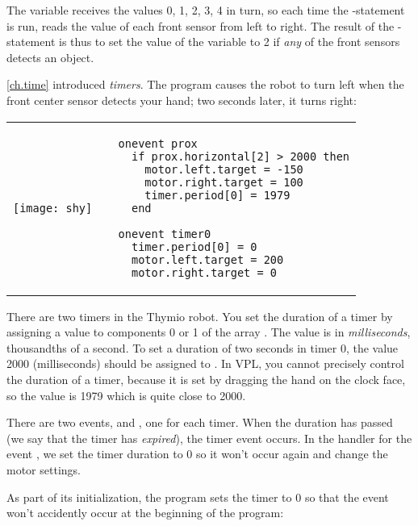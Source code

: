 The variable  receives the values 0, 1, 2, 3, 4 in turn, so each
time the -statement is run,  reads the value
of each front sensor from left to right. The result of the
-statement is thus to set the value of the variable  to
2 if \emph{any} of the front sensors detects an object.



\cref{ch.time} introduced \emph{timers}. The program
 causes the robot to turn left when the front center sensor
detects your hand; two seconds later, it turns right:

\begin{center}
\begin{tabular}{ll}
\texttt{[image: shy]} &
\begin{minipage}[b]{.5\textwidth}
\begin{footnotesize}
\begin{verbatim}
  onevent prox
    if prox.horizontal[2] > 2000 then
      motor.left.target = -150
      motor.right.target = 100
      timer.period[0] = 1979
    end
  
  onevent timer0
    timer.period[0] = 0
    motor.left.target = 200
    motor.right.target = 0
\end{verbatim}
\end{footnotesize}
\end{minipage}
\end{tabular}
\end{center}

There are two timers in the Thymio robot. You set the duration of a
timer by assigning a value to components 0 or 1 of the array
. The value is in \emph{milliseconds}, thousandths of a
second. To set a duration of two seconds in timer 0, the value 2000
(milliseconds) should be assigned to . In VPL, you
cannot precisely control the duration of a timer, because it is set by
dragging the hand on the clock face, so the value is 1979 which is quite
close to 2000.

There are two events,  and , one for each timer.
When the duration has passed (we say that the timer has \emph{expired}),
the timer event occurs. In the handler for the event , we set
the timer duration to 0 so it won't occur again and change the motor
settings.

As part of its initialization, the program sets the timer to 0 so that
the event won't accidently occur at the beginning of the program:

